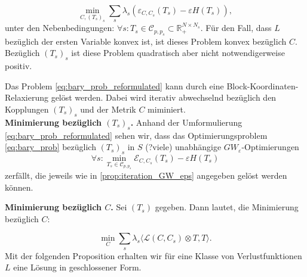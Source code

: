 \documentclass[twoside, 11pt,a4paper]{article}
\numberwithin{equation}{section}
\begin{document}
	\begin{equation}
	\min_{C,(T_s)_s}{\sum_s{\lambda_s(\varepsilon_{C,C_s}(T_s) - \varepsilon H(T_s))}}, \label{eq:bary_prob_reformulated} 
	\end{equation}
	unter den Nebenbedingungen: $ \forall s: T_s \in \mathcal{C}_{p,p_s} \subset \mathbb{R}_{+}^{N \times N_s}$.
	Für den Fall, dass $L$ bezüglich der ersten Variable konvex ist, ist dieses Problem konvex bezüglich $C$. Bezüglich $(T_s)_s$ ist diese Problem quadratisch aber nicht notwendigerweise positiv.
	
	Das Problem \autoref{eq:bary_prob_reformulated} kann durch eine Block-Koordinaten-Relaxierung gelöst werden. Dabei wird iterativ abwechselnd bezüglich den Kopplungen $(T_s)_s$ und der Metrik $C$ miminiert.\\
	
	\noindent \textbf{Minimierung bezüglich $(T_s)_s$.}
	Anhand der Umformulierung \autoref{eq:bary_prob_reformulated} sehen wir, dass das Optimierungsproblem \autoref{eq:bary_prob} bezüglich $(T_s)_s$ in $S$ (?viele) unabhängige $GW_\varepsilon$-Optimierungen
	\begin{equation}
	\forall s : \min_{T_s \in \mathcal{C}_{p, p_s}}{\mathcal{E}_{C,C_s}(T_s)- \varepsilon H(T_s)}
	\end{equation}
	zerfällt, die jeweils wie in \autoref{prop:iteration_GW_eps} angegeben gelöst werden können.
	
	\noindent \textbf{Minimierung bezüglich $C$.} Sei $(T_s)$ gegeben. Dann lautet, die Minimierung bezüglich $C$:
	
	\begin{equation}
	\min_C \sum_s{\lambda_s \langle \mathcal{L}(C,C_s) \otimes T,T \rangle}. \label{eq:minimierung_C}
	\end{equation}
	Mit der folgenden Proposition erhalten wir für eine Klasse von Verlustfunktionen $L$ eine Lösung in geschlossener Form.
	
\end{document}
